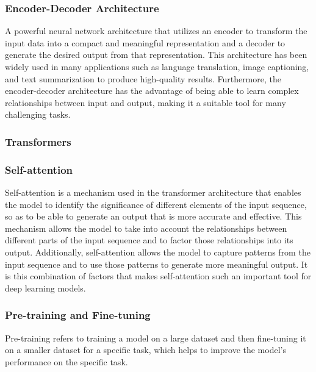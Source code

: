 \subsubsection{Encoder-Decoder Architecture}

A powerful neural network architecture that utilizes an encoder\cite{cho-etal-2014-learning} to transform the input data into a compact and meaningful representation and a decoder to generate the desired output from that representation. This architecture has been widely used in many applications such as language translation, image captioning, and text summarization to produce high-quality results. Furthermore, the encoder-decoder architecture has the advantage of being able to learn complex relationships between input and output, making it a suitable tool for many challenging tasks.

\subsubsection{Transformers}



\subsubsection{Self-attention}

Self-attention\cite{https://doi.org/10.48550/arxiv.1706.03762} is a mechanism used in the transformer architecture that enables the model to identify the significance of different elements of the input sequence, so as to be able to generate an output that is more accurate and effective. This mechanism allows the model to take into account the relationships between different parts of the input sequence and to factor those relationships into its output. Additionally, self-attention allows the model to capture patterns from the input sequence and to use those patterns to generate more meaningful output. It is this combination of factors that makes self-attention such an important tool for deep learning models.

\subsubsection{Pre-training and Fine-tuning}

Pre-training refers to training a model on a large dataset and then fine-tuning it on a smaller dataset for a specific task, which helps to improve the model's performance on the specific task.

